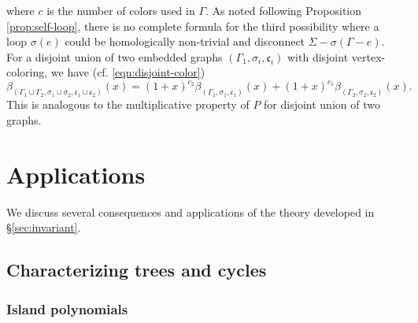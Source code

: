\documentclass[10pt, reqno]{amsart}
\newcommand{\hf}{\hspace*{0.5cm}}
\theoremstyle{plain}
\theoremstyle{remark}
\theoremstyle{definition}
\numberwithin{equation}{section}
\begin{document}
where $c$ is the number of colors used in $\Gamma$. As noted following Proposition \ref{prop:self-loop}, there is no complete formula for the third possibility where a loop $\sigma(e)$ could be homologically non-trivial and disconnect $\Sigma-\sigma(\Gamma-e)$. \\
\hf For a disjoint union of two embedded graphs $(\Gamma_1,\sigma_i,\mathfrak{c}_i)$ with disjoint vertex-coloring, we have (cf. \eqref{eqn:disjoint-color})
$${\beta}_{(\Gamma_1\sqcup\Gamma_2,\sigma_1\sqcup \sigma_2,\mathfrak{c}_1\sqcup\mathfrak{c}_2)}(x)=(1+x)^{c_2}{\beta}_{(\Gamma_1,\sigma_1,\mathfrak{c}_1)}(x)+(1+x)^{c_1}{\beta}_{(\Gamma_2,\sigma_2,\mathfrak{c}_2)}(x).$$
This is analogous to the multiplicative property of $P$ for disjoint union of two graphs.



\section{Applications}
\label{sec:appl}

\hf We discuss several consequences and applications of the theory developed in \S \ref{sec:invariant}.

\subsection{Characterizing trees and cycles}\label{subsec:cycle-tree}

\subsubsection{Island polynomials}
\end{document}
